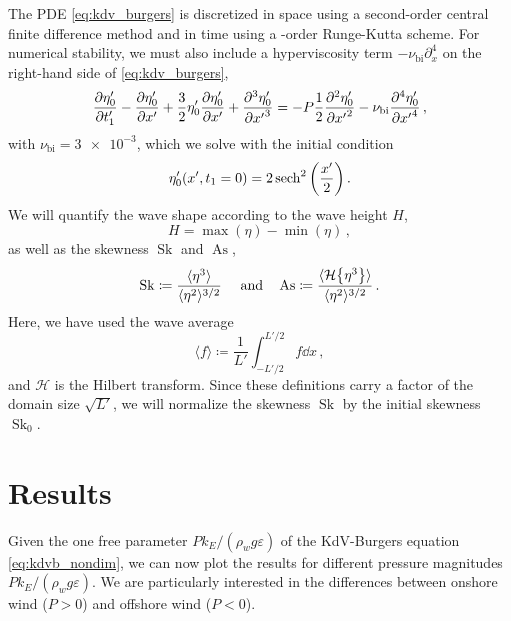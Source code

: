 \documentclass{jfm}
\DeclareMathOperator{\Sk}{Sk}
\DeclareMathOperator{\As}{As}
\newcommand{\hilbert}{\mathcal{H}}
\renewcommand*{\epsilon}{\varepsilon}
\begin{document}
The PDE \cref{eq:kdv_burgers} is discretized in space using a
second-order central finite difference method and in time using a
-order Runge-Kutta scheme.
For numerical stability, we must also include a hyperviscosity term
$-\nu_{\text{bi}} \partial_x^4$ on the right-hand side of
\cref{eq:kdv_burgers},
\begin{equation}
  \pdv{\eta'_0}{t'_1} - \pdv{\eta'_0}{x'} + \frac{3}{2}
  \eta'_0 \pdv{\eta'_0}{x'} + \pdv[3]{\eta'_0}{{x'}} =
  -P \frac{1}{2} \pdv[2]{\eta'_0}{{x'}} - \nu_{\text{bi}}
  \pdv[4]{\eta'_0}{{x'}} \,,
  \label{eq:kdvb_nondim}
\end{equation}
with $\nu_{\text{bi}} = \num{3e-3}$, which we solve with the initial
condition
\begin{equation}
  \eta'_0(x',t_1=0) = 2 \sech^2\pqty{\frac{x'}{2}} \,.
  \label{eq:initial_condition}
\end{equation}
We will quantify the wave shape according to the wave height $H$,
\begin{equation}
  H = \max(\eta) - \min(\eta) \,,
  \label{eq:height_def}
\end{equation}
as well as the skewness $\Sk$ and $\As$,
\begin{equation}
  \Sk \coloneqq \frac{\langle \eta^3 \rangle}{\langle \eta^2
  \rangle^{3/2}} \
  \qq{and}
  \As \coloneqq \frac{\langle \hilbert \Bqty{\eta^3} \rangle}{\langle
    \eta^2 \rangle^{3/2}} \,.
  \label{eq:shape_stats_def}
\end{equation}
Here, we have used the wave average
\begin{equation}
  \langle f \rangle \coloneqq \frac{1}{L'} \int_{-L'/2}^{L'/2} f
  \dd{x} \,,
\end{equation}
and $\hilbert$ is the Hilbert transform.
Since these definitions carry a factor of the domain size $\sqrt{L'}$,
we will normalize the skewness $\Sk$ by the initial skewness $\Sk_0$.

\section{\label{sec:results} Results}
Given the one free parameter $P k_E/(\rho_w g \epsilon)$ of the
KdV-Burgers equation \cref{eq:kdvb_nondim}, we can now plot the results
for different pressure magnitudes $P k_E/(\rho_w g \epsilon)$.
We are particularly interested in the differences between onshore wind
($P > 0$) and offshore wind ($P < 0$).
\end{document}

